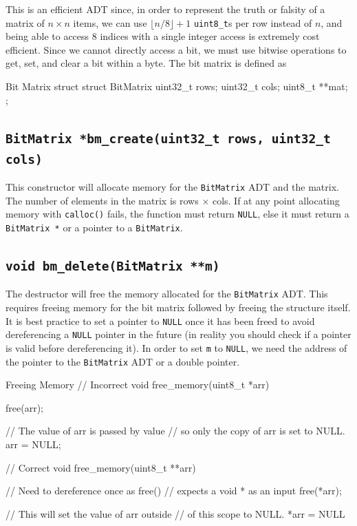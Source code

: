 \documentclass[11pt]{article}
\begin{document}
This is an efficient ADT since, in order to represent the truth
or falsity of a matrix of $n \times n$ items, we can use $\lfloor{n / 8}\rfloor + 1$ \texttt{uint8\_t}s
per row instead of $n$, and being able to access $8$ indices with a single integer
access is extremely cost efficient. Since we cannot directly access a bit, we must
use bitwise operations to get, set, and clear a bit within a byte.
The bit matrix is defined as

\begin{codelisting}{Bit Matrix struct}
struct BitMatrix {
    uint32_t rows;
    uint32_t cols;
    uint8_t **mat;
};
\end{codelisting}

\subsection{\texttt{BitMatrix *bm\_create(uint32\_t rows, uint32\_t cols)}}
This constructor will allocate memory for the \texttt{BitMatrix} ADT and the matrix.
The number of elements in the matrix is rows $\times$ cols.
If at any point allocating memory with \texttt{calloc()} fails, the function must
return \texttt{NULL}, else it must return a \texttt{BitMatrix *} or a pointer to a 
\texttt{BitMatrix}.

\subsection{\texttt{void bm\_delete(BitMatrix **m)}}
The destructor will free the memory allocated for the \texttt{BitMatrix} ADT. This requires freeing
memory for the bit matrix followed by freeing the structure itself. It is best practice
to set a pointer to \texttt{NULL} once it has been freed to avoid dereferencing a \texttt{NULL}
pointer in the future (in reality you should check if a pointer is valid before dereferencing it).
In order to set \texttt{m} to \texttt{NULL}, we need the address of the pointer to the 
\texttt{BitMatrix} ADT or a double pointer.

\begin{codelisting}{Freeing Memory}
// Incorrect
void free_memory(uint8_t *arr) {
    free(arr);
    
    // The value of arr is passed by value
    // so only the copy of arr is set to NULL.
    arr = NULL;
}

// Correct
void free_memory(uint8_t **arr) {
    // Need to dereference once as free()
    // expects a void * as an input
    free(*arr);
    
    // This will set the value of arr outside
    // of this scope to NULL.
    *arr = NULL
}
\end{codelisting}
\end{document}
